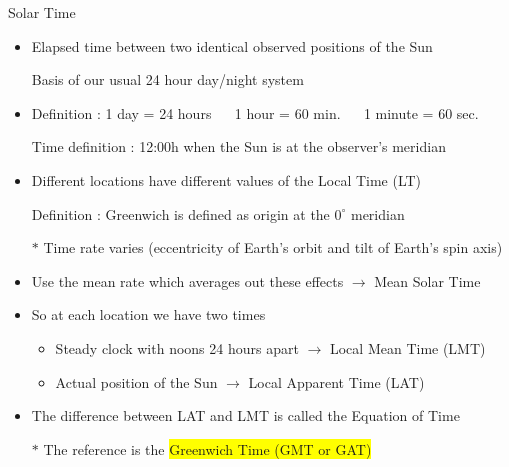 \begin{center}
{\red Solar Time}
\end{center}
%
\begin{itemize}
\item {\blue Elapsed time between two identical observed positions of the Sun}
\item[] Basis of our usual 24 hour day/night system
\item Definition : 1 day = 24 hours $\quad$ 1 hour = 60 min. $\quad$ 1 minute = 60 sec.
\item[] Time definition : 12:00h when the Sun is at the observer's meridian
\item Different locations have different values of the {\blue Local Time (LT)}
\item[] Definition : {\blue Greenwich is defined as origin at the $0^{\circ}$ meridian}
\item[$\ast$] Time rate varies (eccentricity of Earth's orbit and tilt of Earth's spin axis)
\item Use the mean rate which averages out these effects $\rightarrow$ {\blue Mean Solar Time}
\item So at each location we have two times
\begin{itemize}
\item Steady clock with noons 24 hours apart $\rightarrow$ {\blue Local Mean Time (LMT)}
\item Actual position of the Sun $\rightarrow$ {\blue Local Apparent Time (LAT)}
\end{itemize}
\item The difference between LAT and LMT is called the {\blue Equation of Time}
\item[$\ast$] The reference is the \colorbox{yellow}{Greenwich Time (GMT or GAT)} 
\end{itemize}

